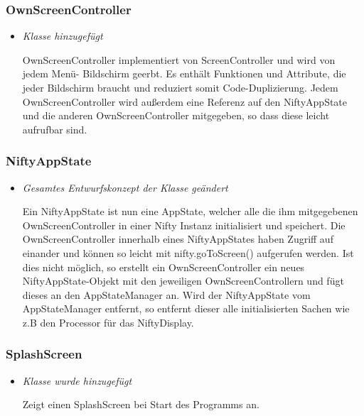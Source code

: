 \subsubsection{OwnScreenController}
\begin{itemize}
    \item \textit{Klasse hinzugefügt}
        \begin{leftbar}[0.9\linewidth]
            OwnScreenController implementiert von ScreenController und wird von jedem Menü-
            Bildschirm geerbt. Es enthält Funktionen und Attribute, die jeder Bildschirm 
            braucht und reduziert somit Code-Duplizierung. Jedem OwnScreenController wird 
            außerdem eine Referenz auf den NiftyAppState und die anderen OwnScreenController
            mitgegeben, so dass diese leicht aufrufbar sind.
        \end{leftbar}
\end{itemize}

\subsubsection{NiftyAppState}
\begin{itemize}
    \item \textit{Gesamtes Entwurfskonzept der Klasse geändert}
        \begin{leftbar}[0.9\linewidth]
            Ein NiftyAppState ist nun eine AppState, welcher alle die ihm mitgegebenen 
            OwnScreenController in einer Nifty Instanz initialisiert und speichert.
            Die OwnScreenController innerhalb eines NiftyAppStates haben Zugriff auf 
            einander und können so leicht mit nifty.goToScreen() aufgerufen werden.
            Ist dies nicht möglich, so erstellt ein OwnScreenController ein neues 
            NiftyAppState-Objekt mit den jeweiligen OwnScreenControllern und fügt dieses
            an den AppStateManager an.
            Wird der NiftyAppState vom AppStateManager entfernt, so entfernt dieser alle 
            initialisierten Sachen wie z.B den Processor für das NiftyDisplay.
        \end{leftbar}
\end{itemize}

\subsubsection{SplashScreen}
\begin{itemize}
    \item \textit{Klasse wurde hinzugefügt}
        \begin{leftbar}[0.9\linewidth]
            Zeigt einen SplashScreen bei Start des Programms an.
        \end{leftbar}
\end{itemize}

